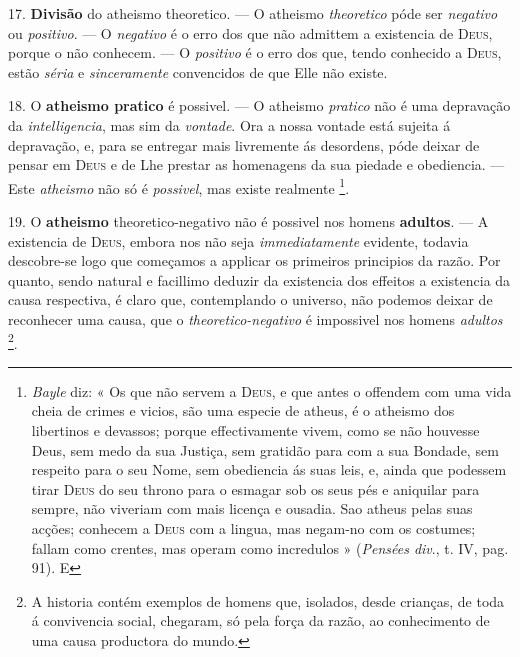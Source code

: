 17. \textbf{Divisão} do atheismo theoretico. --- O atheismo \emph{theoretico} póde ser \emph{negativo} ou \emph{positivo}. --- O \emph{negativo} é o erro dos que não admittem a existencia de \textsc{Deus}, porque o não conhecem. --- O \emph{positivo} é o erro dos que, tendo conhecido a \textsc{Deus}, estão \emph{séria} e \emph{sinceramente} convencidos de que Elle não existe.

 18. O \textbf{atheismo pratico} é possivel. --- O atheismo \emph{pratico} não é uma depravação da \emph{intelligencia}, mas sim da \emph{vontade}. Ora a nossa vontade está sujeita á depravação, e, para se entregar mais livremente ás desordens, póde deixar de pensar em \textsc{Deus} e de Lhe prestar as homenagens da sua piedade e obediencia. --- Este \emph{atheismo} não só é \emph{possivel}, mas existe realmente \footnote{\emph{Bayle} diz: « Os que não servem a \textsc{Deus}, e que antes o offendem com uma vida cheia de crimes e vicios, são uma especie de atheus, é o atheismo dos libertinos e devassos; porque effectivamente vivem, como se não houvesse Deus, sem medo da sua Justiça, sem gratidão para com a sua Bondade, sem respeito para o seu Nome, sem obediencia ás suas leis, e, ainda que podessem tirar \textsc{Deus} do seu throno para o esmagar sob os seus pés e aniquilar para sempre, não viveriam com mais licença e ousadia. Sao atheus pelas suas acções; conhecem a \textsc{Deus} com a lingua, mas negam-no com os costumes; fallam como crentes, mas operam como incredulos » (\emph{Pensées div}., t. IV, pag. 91). E}.

19. O \textbf{atheismo} theoretico-negativo não é possivel nos homens \textbf{adultos}. --- A existencia de \textsc{Deus}, embora nos não seja \emph{immediatamente} evidente, todavia descobre-se logo que começamos a applicar os primeiros principios da razão. Por quanto, sendo natural e facillimo deduzir da existencia dos effeitos a existencia da causa respectiva, é claro que, contemplando o universo, não podemos deixar de reconhecer uma causa, que o  \emph{theoretico-negativo} é impossivel nos homens \emph{adultos} \footnote{A historia contém exemplos de homens que, isolados, desde crianças, de toda á convivencia social, chegaram, só pela força da razão, ao conhecimento de uma causa productora do mundo.}.

